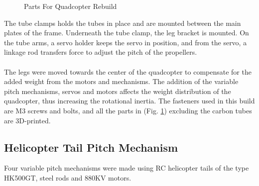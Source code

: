 \begin{figure}[h]
\begin{minipage}[b]{0.35\textwidth}
            \caption{Parts For Quadcopter Rebuild}
           \label{fig:PartsForArdu}
        \end{minipage}
\end{figure}

\noindent
The tube clamps holds the tubes in place and are mounted between the main plates of the frame. Underneath the tube clamp, the leg bracket is mounted. On the tube arms, a servo holder keeps the servo in position, and from the servo, a linkage rod transfers force to adjust the pitch of the propellers.
\\\\
The legs were moved towards the center of the quadcopter to compensate for the added weight from the motors and mechanisms. The addition of the variable pitch mechanisms, servos and motors affects the weight  distribution of the quadcopter, thus increasing the rotational inertia. The fasteners used in this build are M3 screws and bolts, and all the parts in (Fig. \ref{fig:PartsForArdu}) excluding the carbon tubes are 3D-printed. 
\newpage
\subsection{Helicopter Tail Pitch Mechanism}

Four variable pitch mechanisms were made using RC helicopter tails of the type HK500GT, steel rods and 880KV motors.

